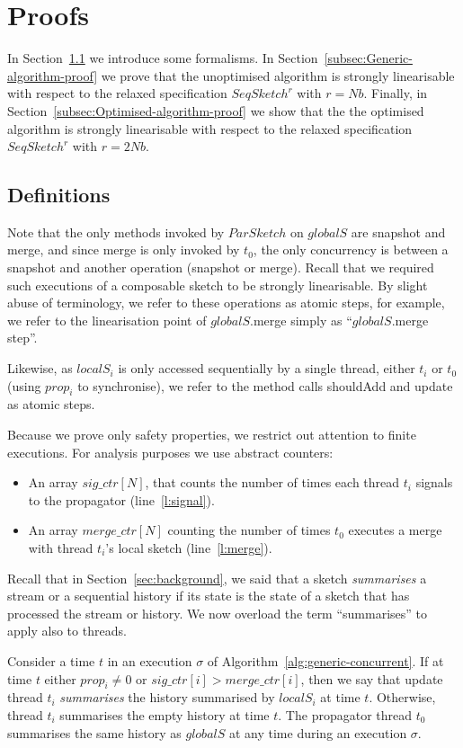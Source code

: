 \section{Proofs}
\label{sec:proofs}

In Section~\ref{sec:analysis:definitions} we introduce some formalisms.
In Section~\ref{subsec:Generic-algorithm-proof} we prove that
the unoptimised algorithm is strongly linearisable with respect to
the relaxed specification $SeqSketch^r$ with $r=Nb$. Finally,
in Section~\ref{subsec:Optimised-algorithm-proof} we show that
the the optimised algorithm is strongly linearisable with respect to
the relaxed specification $SeqSketch^r$ with $r=2Nb$.

\subsection{Definitions}
\label{sec:analysis:definitions}
Note that the only methods invoked by $ParSketch$ on $globalS$ are snapshot and merge, and since merge is
only invoked by $t_0$, the only concurrency is between a snapshot and another operation (snapshot or merge).
Recall that we required such executions of a composable sketch to be strongly linearisable. By slight abuse
of terminology, we refer to these operations as atomic steps, for example, we refer to the linearisation
point of $globalS$.merge simply as ``$globalS$.merge step''.

Likewise, as $localS_i$ is only accessed sequentially by a
single thread, either $t_i$ or $t_0$ (using $prop_i$ to synchronise),
we refer to the method calls shouldAdd and update as atomic steps.

Because we prove only safety properties, we restrict out attention to finite executions.
For analysis purposes we use abstract counters:
\begin{itemize}
    \item An array $sig\_ctr[N]$, that counts the number of times each thread $t_i$ signals to the propagator (line~\ref{l:signal}).
    \item An array $merge\_ctr[N]$ counting the number of times $t_0$ executes a merge with thread $t_i$'s local sketch (line~\ref{l:merge}).
\end{itemize}

Recall that in Section~\ref{sec:background}, we said that a sketch \emph{summarises} a
stream or a sequential history if its state is the state of a sketch that has processed
the stream or history. We now overload the term ``summarises'' to apply also to threads.
\begin{definition}
    Consider a time $t$ in an execution $\sigma$ of Algorithm~\ref{alg:generic-concurrent}. If at time $t$ either $prop_i \neq 0$
    or $sig\_ctr[i]>merge\_ctr[i]$, then we say that update thread $t_i$ \emph{summarises} the history
    summarised by $localS_i$ at time $t$. Otherwise, thread $t_i$ summarises the empty history at time $t$.
    The propagator thread $t_0$ summarises the same history as $globalS$ at any time during an execution $\sigma$.
\label{def:thread-summary}
\end{definition}

